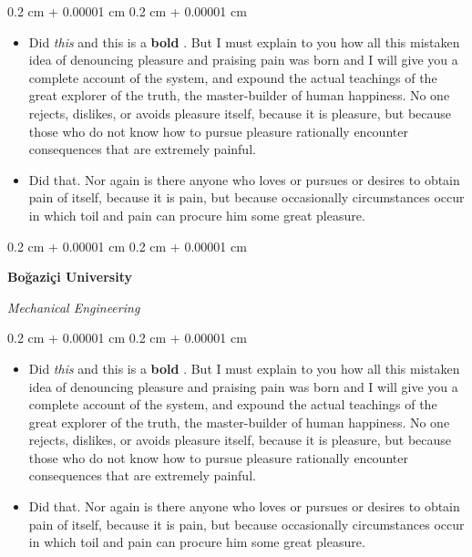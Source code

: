 \documentclass[10pt, letterpaper]{article}
\newenvironment{highlights}{
    \begin{itemize}[
        topsep=0.10 cm,
        parsep=0.10 cm,
        partopsep=0pt,
        itemsep=0pt,
        leftmargin=0.4 cm + 10pt
    ]
}{
    \end{itemize}
} %
\newenvironment{onecolentry}{
    \begin{adjustwidth}{
        0.2 cm + 0.00001 cm
    }{
        0.2 cm + 0.00001 cm
    }
}{
    \end{adjustwidth}
} %
\let\hrefWithoutArrow\href
\renewcommand{\href}[2]{\hrefWithoutArrow{#1}{\ifthenelse{\equal{#2}{}}{ }{#2 }\raisebox{.15ex}{\footnotesize \faExternalLink*}}}
\begin{document}
        \vspace{0.10 cm}
        \begin{onecolentry}
            \begin{highlights}
                \item Did \textit{this} and this is a \textbf{bold} \href{https://example.com}{link}. But I must explain to you how all this mistaken idea of denouncing pleasure and praising pain was born and I will give you a complete account of the system, and expound the actual teachings of the great explorer of the truth, the master-builder of human happiness. No one rejects, dislikes, or avoids pleasure itself, because it is pleasure, but because those who do not know how to pursue pleasure rationally encounter consequences that are extremely painful.
                \item Did that. Nor again is there anyone who loves or pursues or desires to obtain pain of itself, because it is pain, but because occasionally circumstances occur in which toil and pain can procure him some great pleasure.
            \end{highlights}
        \end{onecolentry}


        \vspace{0.2 cm}

        \begin{onecolentry}
            \textbf{Boğaziçi University}

            \textit{Mechanical Engineering}
        \end{onecolentry}

        \vspace{0.10 cm}
        \begin{onecolentry}
            \begin{highlights}
                \item Did \textit{this} and this is a \textbf{bold} \href{https://example.com}{link}. But I must explain to you how all this mistaken idea of denouncing pleasure and praising pain was born and I will give you a complete account of the system, and expound the actual teachings of the great explorer of the truth, the master-builder of human happiness. No one rejects, dislikes, or avoids pleasure itself, because it is pleasure, but because those who do not know how to pursue pleasure rationally encounter consequences that are extremely painful.
                \item Did that. Nor again is there anyone who loves or pursues or desires to obtain pain of itself, because it is pain, but because occasionally circumstances occur in which toil and pain can procure him some great pleasure.
            \end{highlights}
        \end{onecolentry}
\end{document}
